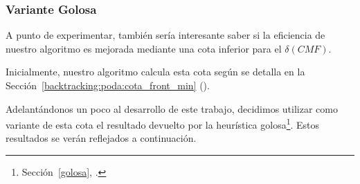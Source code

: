 \subsubsection{Variante Golosa}
\par A punto de experimentar, tambi\'en ser\'ia interesante saber si la eficiencia
    de nuestro algoritmo es mejorada mediante una cota inferior para el $\delta(CMF)$.

\par Inicialmente, nuestro algoritmo calcula esta cota seg\'un se detalla en la
    Secci\'on~\ref{backtracking:poda:cota_front_min} ().

\par Adelant\'andonos un poco al desarrollo de este trabajo, decidimos utilizar como
    variante de esta cota el resultado devuelto por la heur\'istica golosa\footnote{%
    Secci\'on~\ref{golosa}, \emph{}.}. Estos resultados se ver\'an
    reflejados a continuaci\'on.
